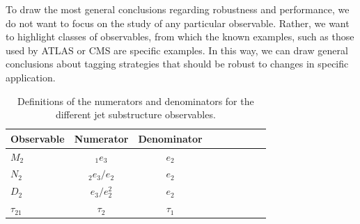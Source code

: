 \documentclass[11pt,letterpaper]{article}
\newcommand{\ecfnobeta}[1]{e_{#1}}
\newcommand{\ecfvarnobeta}[2]{{_{#1}e_{#2}}}
\begin{document}
To draw the most general conclusions regarding robustness and performance, we do not want to focus on the study of any particular observable.
%
Rather, we want to highlight classes of observables, from which the known examples, such as those used by ATLAS or CMS are specific examples.
%
In this way, we can draw general conclusions about tagging strategies that should be robust to changes in specific application.

\begin{table}
\begin{center}
\begin{tabular}{| l | c | c |c |c|c|c |c|r| }
  \hline                       
  Observable &  Numerator & Denominator \\
  \hline
  $M_2$ &   $\ecfvarnobeta{1}{3}$ & $ \ecfnobeta{2}$ \\
  $N_2$ &   $\ecfvarnobeta{2}{3} / \ecfnobeta{2} $ & $ \ecfnobeta{2}$ \\
  $D_2$ &   $\ecfnobeta{3} / \ecfnobeta{2}^2 $ & $ \ecfnobeta{2}$ \\
  $\tau_{21}$ &   $\tau_2$ & $\tau_1$ \\
  \hline  
\end{tabular}
\end{center}
\caption{
Definitions of the numerators and denominators for the different jet substructure observables.
}
\label{tab:dn}
\end{table}
\end{document}
